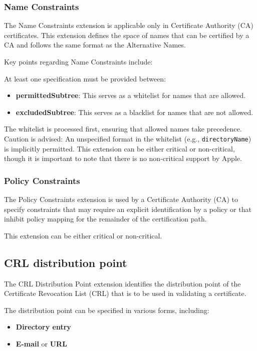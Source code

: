 \subsubsection{Name Constraints}
The Name Constraints extension is applicable only in 
Certificate Authority (CA) certificates. This extension 
defines the space of names that can be certified by a CA 
and follows the same format as the Alternative Names.

Key points regarding Name Constraints include:

At least one specification must be provided between:
\begin{itemize}
    \item \textbf{permittedSubtree}: This serves as a 
    whitelist for names that are allowed.
    \item \textbf{excludedSubtree}: This serves as a 
    blacklist for names that are not allowed.
\end{itemize}

The whitelist is processed first, ensuring that allowed 
names take precedence. Caution is advised: An unspecified 
format in the whitelist (e.g., \texttt{directoryName}) 
is implicitly permitted. This extension can be either 
critical or non-critical, though it is important to note 
that there is no non-critical support by Apple.
\subsubsection{Policy Constraints}
The Policy Constraints extension is used by a 
Certificate Authority (CA) to specify constraints 
that may require an explicit identification by a 
policy or that inhibit policy mapping for the 
remainder of the certification path. 

This extension can be either critical or non-critical.

\subsection{CRL distribution point}

The CRL Distribution Point extension identifies the 
distribution point of the Certificate Revocation List 
(CRL) that is to be used in validating a certificate. 

The distribution point can be specified in various forms, 
including:
\begin{itemize}
    \item \textbf{Directory entry}
    \item \textbf{E-mail} or \textbf{URL}
\end{itemize}

